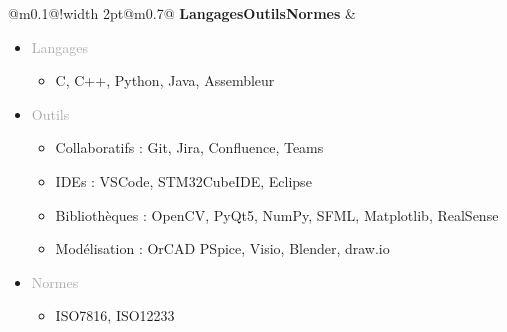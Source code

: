 \documentclass{article}
\begin{document}
\begin{tabular}{@{\hspace{0.05\textwidth}}m{}@{\hspace{0.05\textwidth}}!{\color{antiEnsea}\vline width 2pt}@{}m{0.7\textwidth}@{}}
    \textcolor{antiEnsea}{\textbf{Langages\newline Outils\newline Normes}} & 
    \begin{itemize}[label={}, topsep=0pt, partopsep=0pt, itemsep=0pt, parsep=0pt] 
        \setlength{\itemsep}{0pt} %

        \item \textcolor{darkGray}{Langages}
        \begin{itemize}[label={\textcolor{gray!80}{\checkmark}}, topsep=0pt, partopsep=0pt, itemsep=0pt, parsep=0pt] 
            \item \textcolor{gray!80}{C, C++, Python, Java, Assembleur}
        \end{itemize}

        \item \textcolor{darkGray}{Outils}
        \begin{itemize}[label={\textcolor{gray!80}{\checkmark}}, topsep=0pt, partopsep=0pt, itemsep=0pt, parsep=0pt]
            \item \textcolor{gray!80}{Collaboratifs : Git, Jira, Confluence, Teams}
            \item \textcolor{gray!80}{IDEs : VSCode, STM32CubeIDE, Eclipse}
            \item \textcolor{gray!80}{Bibliothèques : OpenCV, PyQt5, NumPy, SFML, Matplotlib, RealSense}
            \item \textcolor{gray!80}{Modélisation : OrCAD PSpice, Visio, Blender, draw.io}
        \end{itemize}

        \item \textcolor{darkGray}{Normes}
        \begin{itemize}[label={\textcolor{gray!80}{\checkmark}}, topsep=0pt, partopsep=0pt, itemsep=0pt, parsep=0pt, after=\vspace*{-\baselineskip}] 
            \item \textcolor{gray!80}{ISO7816, ISO12233}
        \end{itemize}
    \end{itemize}
\end{tabular}


\end{document}
